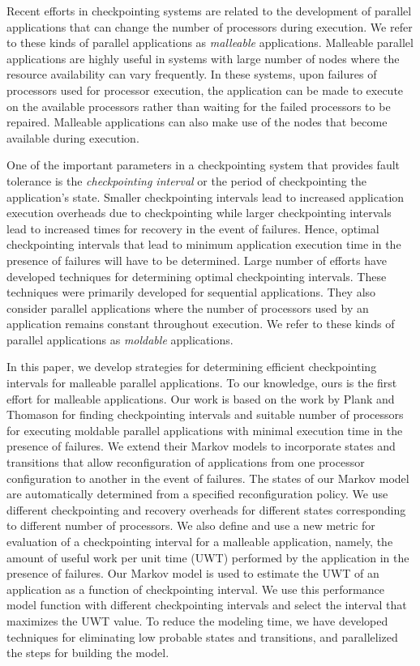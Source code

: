 \documentclass[conference,10pt]{IEEEtran}
\begin{document}
Recent efforts in checkpointing systems are related to the development
of parallel applications that can change the number of processors
during execution\cite{vadhiyar-srs-ppl2003,fernandez-mobilempi-ppopp06}. We
refer to these kinds of parallel applications as {\em malleable}
applications. Malleable parallel applications are highly useful in
systems with large number of nodes where the resource availability can
vary frequently. In these systems, upon failures of processors used
for processor execution, the application can be made to execute on the
available processors rather than waiting for the failed processors to
be repaired. Malleable applications can also make use of the nodes
that become available during execution.

One of the important parameters in a checkpointing system that
provides fault tolerance is the {\em checkpointing interval} or the
period of checkpointing the application's state. Smaller checkpointing
intervals lead to increased application execution overheads due to
checkpointing while larger checkpointing intervals lead to increased
times for recovery in the event of failures. Hence, optimal
checkpointing intervals that lead to minimum application execution
time in the presence of failures will have to be determined. Large
number of efforts have developed techniques for determining optimal
checkpointing intervals\cite{elnozahy-survey-cmureport96}. These
techniques were primarily developed for sequential applications. They
also consider parallel applications where the number of processors
used by an application remains constant throughout execution. We refer
to these kinds of parallel applications as {\em moldable}
applications.

In this paper, we develop strategies for determining efficient
checkpointing intervals for malleable parallel applications. To our
knowledge, ours is the first effort for malleable applications. Our
work is based on the work by Plank and
Thomason\cite{plank-processorallocation-jpdc01} for finding
checkpointing intervals and suitable number of processors for
executing moldable parallel applications with minimal execution time
in the presence of failures. We extend their Markov models to
incorporate states and transitions that allow reconfiguration of
applications from one processor configuration to another in the event
of failures. The states of our Markov model are automatically
determined from a specified reconfiguration policy. We use different
checkpointing and recovery overheads for different states
corresponding to different number of processors. We also define and
use a new metric for evaluation of a checkpointing interval for
a malleable application, namely, the amount of useful work per unit time
(UWT) performed by the application in the presence of
failures.  Our Markov model is used to estimate the UWT of an
application as a function of checkpointing interval. We use this
performance model function with different checkpointing intervals and
select the interval that maximizes the UWT value. To reduce the
modeling time, we have developed techniques for eliminating low
probable states and transitions, and parallelized the steps for
building the model.
\end{document}
